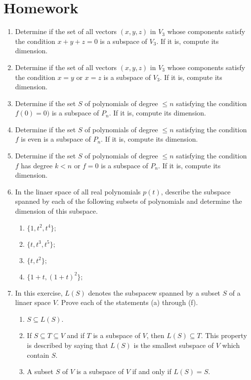 \documentclass[main.tex]{subfiles}
\begin{document}
    \section*{Homework}
    \begin{enumerate} %
        \item Determine if the set of all vectors $(x,y,z)$ in $V_3$ whose components satisfy the condition $x+y+z = 0$ is a subspace of $V_3$. If it is, compute its dimension.
        \item Determine if the set of all vectors $(x,y,z)$ in $V_3$ whose components satisfy the condition $x=y$ or $x=z$ is a subspace of $V_3$. If it is, compute its dimension.
        \item Determine if the set $S$ of polynomials of degree $\leq n$ satisfying the condition $f(0)=0)$ is a subspace of $P_n$. If it is, compute its dimension.
        \item Determine if the set $S$ of polynomials of degree $\leq n$ satisfying the condition $f$ is even is a subspace of $P_n$. If it is, compute its dimension.
        \item Determine if the set $S$ of polynomials of degree $\leq n$ satisfying the condition $f$ has degree $k < n$ or $f = 0$ is a subspace of $P_n$. If it is, compute its dimension.
        \item In the linaer space of all real polynomials $p(t)$, describe the subspace spanned by each of the following subsets of polynomials and determine the dimension of this subspace. 
        \begin{enumerate}
            \item $\{1,t^2,t^4\};$
            \item $\{t,t^3,t^5\};$
            \item $\{t,t^2\};$
            \item $\{1+t,(1+t)^2\};$
        \end{enumerate}
        \item In this exercise, $L(S)$ denotes the subspacew spanned by a subset $S$ of a linaer space $V$. Prove each of the statements (a) through (f).
        \begin{enumerate}
            \item $S\subseteq L(S)$.
            \item If $S \subseteq T \subseteq V$ and if $T$ is a subspace of $V$, then $L(S) \subseteq T$. This property is described by saying that $L(S)$ is the smallest subspace of $V$ which contain $S$.
            \item A subset $S$ of $V$ is a subspace of $V$ if and only if $L(S) = S$.

\end{enumerate}
\end{enumerate}
\end{document}
